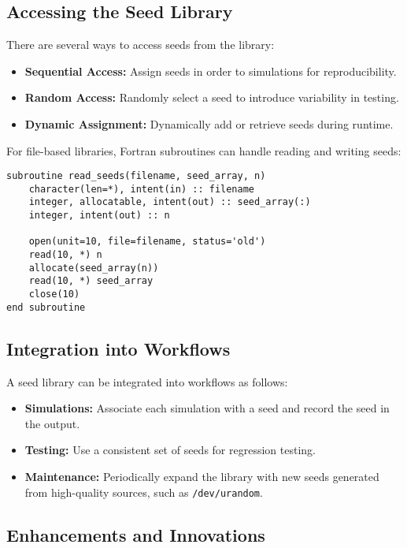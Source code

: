 \documentclass[12pt]{article}
\begin{document}
\subsection{Accessing the Seed Library}

There are several ways to access seeds from the library:
\begin{itemize}
    \item \textbf{Sequential Access:} Assign seeds in order to simulations for reproducibility.
    \item \textbf{Random Access:} Randomly select a seed to introduce variability in testing.
    \item \textbf{Dynamic Assignment:} Dynamically add or retrieve seeds during runtime.
\end{itemize}

For file-based libraries, Fortran subroutines can handle reading and writing seeds:
\begin{verbatim}
subroutine read_seeds(filename, seed_array, n)
    character(len=*), intent(in) :: filename
    integer, allocatable, intent(out) :: seed_array(:)
    integer, intent(out) :: n

    open(unit=10, file=filename, status='old')
    read(10, *) n
    allocate(seed_array(n))
    read(10, *) seed_array
    close(10)
end subroutine
\end{verbatim}

\subsection{Integration into Workflows}

A seed library can be integrated into workflows as follows:
\begin{itemize}
    \item \textbf{Simulations:} Associate each simulation with a seed and record the seed in the output.
    \item \textbf{Testing:} Use a consistent set of seeds for regression testing.
    \item \textbf{Maintenance:} Periodically expand the library with new seeds generated from high-quality sources, such as \texttt{/dev/urandom}.
\end{itemize}

\subsection{Enhancements and Innovations}
\end{document}
